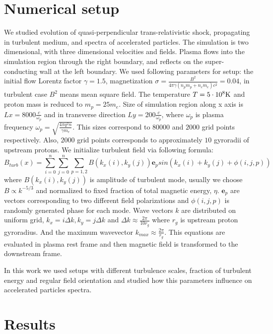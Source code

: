 \documentclass[a4paper]{jpconf}
\begin{document}
\section{Numerical setup}
We studied evolution of quasi-perpendicular trans-relativistic shock, propagating in turbulent medium, and spectra of accelerated particles. The simulation is two dimensional, with three dimensional velocities and fields. Plasma flows into the simulation region through the right boundary, and reflects on the super-conducting wall at the left boundary. We used following parameters for setup: the initial flow Lorentz factor $\gamma = 1.5$, magnetization $\sigma = \frac{B^2}{4\pi\gamma (n_p m_p + n_e m_e) c^2} = 0.04$, in turbulent case $B^2$ means mean square field. The temperature $T = 5\cdot10^8 \rm{K}$ and proton mass is reduced to $m_p = 25 m_e$. Size of simulation region along x axis is $Lx = 8000\frac{c}{\omega_p}$ and in transverse direction $Ly = 200\frac{c}{\omega_p}$, where $\omega_p$ is plasma frequency $\omega_p = \sqrt{\frac{4\pi q^2 n}{\gamma m_e}}$. This sizes correspond to $80000$ and $2000$ grid points respectively. Also, $2000$ grid points corresponds to approximately $10$ gyroradii of upstream protons.
We initialize turbulent field via following formula: 
\begin{equation}
B_{turb} (x) = \sum_{i=0}^{n}\sum_{j=0}^{n}\sum_{p=1,2}B(k_x(i),k_y(j)) \textbf{e}_{p} sin(k_x(i) + k_y(j) + \phi (i,j,p))
\end{equation}
where $B(k_x(i),k_y(j))$ is amplitude of turbulent mode, usually we choose $B \propto k^{-5/3}$ and normalized to fixed fraction of total magnetic energy, $\eta$. $\textbf{e}_{p}$ are vectors corresponding to two different field polarizations and $\phi (i,j,p)$ is randomly generated phase for each mode. Wave vectors $k$ are distributed on uniform grid, $k_x = i \Delta k, k_y = j \Delta k$ and $\Delta k \approx \frac{2 \pi}{10 r_g}$ where $r_g$ is upstream proton gyroradius. And the maximum wavevector $k_{max} \approx \frac{2 \pi}{r_g}$. This equations are evaluated in plasma rest frame and then magnetic field is transformed to the downstream frame.

In this work we used setups with different turbulence scales, fraction of turbulent energy and regular field orientation and studied how this parameters influence on accelerated particles spectra.
\section{Results}
\end{document}
